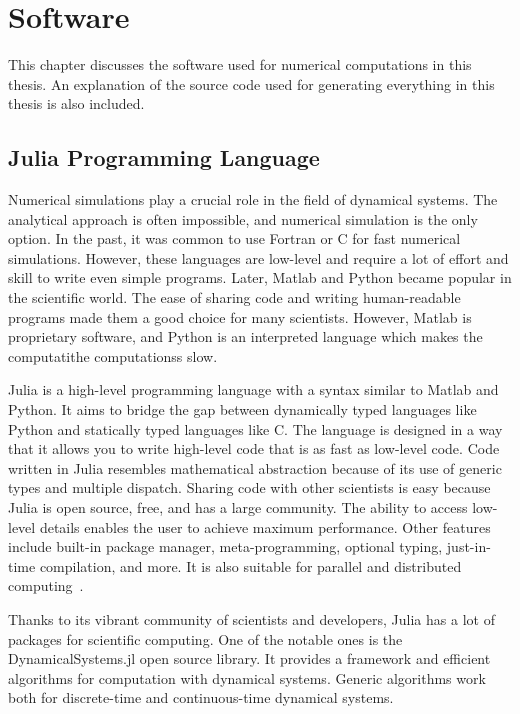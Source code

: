 \chapter{Software}
\label{sec:software}

This chapter discusses the software used for numerical computations in this thesis.
An explanation of the source code used for generating everything in this thesis is also included.

\section{Julia Programming Language}
Numerical simulations play a crucial role in the field of dynamical systems.
The analytical approach is often impossible, and numerical simulation is the only option.
In the past, it was common to use Fortran or C for fast numerical simulations.
However, these languages are low-level and require a lot of effort and skill to write even simple programs.
Later, Matlab and Python became popular in the scientific world.
The ease of sharing code and writing human-readable programs made them a good choice for many scientists.
However, Matlab is proprietary software, and Python is an interpreted language which makes the computatithe computationss slow.
\par
Julia is a high-level programming language with a syntax similar to Matlab and Python.
It aims to bridge the gap between dynamically typed languages like Python and statically typed languages like C.
The language is designed in a way that it allows you to write high-level code that is as fast as low-level code.
Code written in Julia resembles mathematical abstraction because of its use of generic types and multiple dispatch. 
Sharing code with other scientists is easy because Julia is open source, free, and has a large community. 
The ability to access low-level details enables the user to achieve maximum performance.
Other features include built-in package manager, meta-programming, optional typing, just-in-time compilation, and more.
It is also suitable for parallel and distributed computing~\cite{Bezanson2017,Bezanson20181024}.
\par
Thanks to its vibrant community of scientists and developers, Julia has a lot of packages for scientific computing.
One of the notable ones is the DynamicalSystems.jl open source library.
It provides a framework and efficient algorithms for computation with dynamical systems.
Generic algorithms work both for discrete-time and continuous-time dynamical systems.
